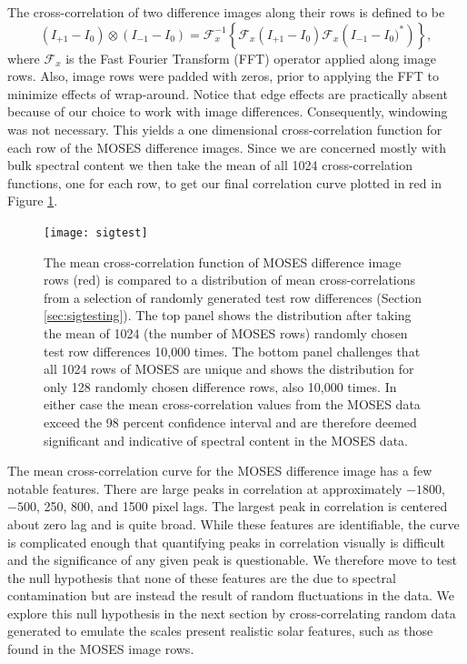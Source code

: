         The cross-correlation of two difference images along their rows is defined to be
        \begin{equation}
         \left(I_{+1}-I_0\right) \otimes \left(I_{-1}-I_0\right) = \mathcal{F}_x^{-1} \left\{\mathcal{F}_x\left(I_{+1}-I_0 \right)\mathcal{F}_x\left( I_{-1}-I_0)^* \right)  \right\},
         \label{eqn:cross_correlate}
        \end{equation}
        where $\mathcal{F}_x$ is the Fast Fourier Transform (FFT) operator applied along image rows.  
        Also, image rows were padded with zeros, prior to applying the FFT to minimize effects of wrap-around. 
        Notice that edge effects are practically absent because of our choice to work with image differences. 
        Consequently, windowing was not necessary.
        This yields a one dimensional cross-correlation function for each row of the MOSES difference images.  
        Since we are concerned mostly with bulk spectral content we then take the mean of all 1024 cross-correlation functions, one for each row, to get our final correlation curve plotted in red in Figure \ref{fig:sigtest}. 
		 
		 \begin{figure}
		 	\centering
		 	\texttt{[image: sigtest]}
            \caption{The mean cross-correlation function of MOSES difference image rows (red) is compared to a distribution of mean cross-correlations from a selection of randomly generated test row differences (Section \ref{sec:sigtesting}). 
            The top panel shows the distribution after taking the mean of 1024 (the number of MOSES rows) randomly chosen test row differences 10,000 times.  
            The bottom panel challenges that all 1024 rows of MOSES are unique and shows the distribution for only 128 randomly chosen difference rows, also 10,000 times.  
            In either case the mean cross-correlation values from the MOSES data exceed the 98 percent confidence interval and are therefore deemed significant and indicative of spectral content in the MOSES data.}
		 	\label{fig:sigtest}
		 \end{figure}
		 
	 
		 The mean cross-correlation curve for the MOSES difference image has a few notable features.  
		 There are large%
		 peaks in correlation  at approximately $-1800$, $-500$, 250, 800, and 1500 pixel lags.  
		 The largest peak in correlation is centered about zero lag and is quite broad.   
		 While these features are identifiable, the curve is complicated enough that quantifying peaks in correlation visually is difficult and the significance of any given peak is questionable. 
		 We therefore move to test the null hypothesis that none of these features are the due to spectral contamination but are instead the result of random fluctuations in the data. 
		 We explore this null hypothesis in the next section by cross-correlating random data generated to emulate the scales present realistic solar features, such as those found in the MOSES image rows.
 
